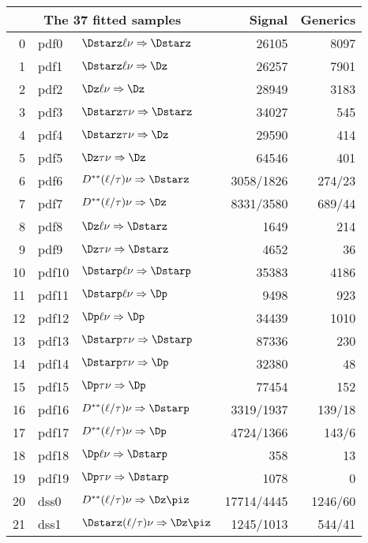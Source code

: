 \documentclass[6pt]{article}
\begin{document}
\begin{tabular}{r l l r r}\\ \hline\hline
\multicolumn{3}{c}{\bf The 37 fitted samples}    &  Signal & Generics  \\ \hline
0 & pdf0   & $\Dstarz\ell\nu\Rightarrow\Dstarz$    &  26105   &  8097  \\
1 & pdf1   & $\Dstarz\ell\nu\Rightarrow\Dz$    &   26257  &  7901  \\
2 & pdf2   & $\Dz\ell\nu\Rightarrow\Dz$    &   28949  &  3183  \\
3 & pdf3   & $\Dstarz\tau\nu\Rightarrow\Dstarz$    &  34027   &  545  \\
4 & pdf4   & $\Dstarz\tau\nu\Rightarrow\Dz$    &   29590  &  414  \\
5 & pdf5   & $\Dz\tau\nu\Rightarrow\Dz$    &  64546   &  401  \\
6 & pdf6   & $D^{**}(\ell/\tau)\nu\Rightarrow\Dstarz$    &  3058/1826  &  274/23  \\
7 & pdf7   & $D^{**}(\ell/\tau)\nu\Rightarrow\Dz$    &  8331/3580   &  689/44  \\
8 & pdf8   & $\Dz\ell\nu\Rightarrow\Dstarz$   &  1649  &  214  \\
9 & pdf9   & $\Dz\tau\nu\Rightarrow\Dstarz$   & 4652   &  36  \\
10 & pdf10 & $\Dstarp\ell\nu\Rightarrow\Dstarp$   &  35383  & 4186   \\
11 & pdf11 & $\Dstarp\ell\nu\Rightarrow\Dp$   &  9498  &  923  \\
12 & pdf12 & $\Dp\ell\nu\Rightarrow\Dp$   &  34439  & 1010   \\
13 & pdf13 & $\Dstarp\tau\nu\Rightarrow\Dstarp$   &  87336  &  230  \\
14 & pdf14 & $\Dstarp\tau\nu\Rightarrow\Dp$   &  32380  & 48   \\
15 & pdf15 & $\Dp\tau\nu\Rightarrow\Dp$   & 77454   &  152  \\
16 & pdf16 & $D^{**}(\ell/\tau)\nu\Rightarrow\Dstarp$   & 3319/1937   & 139/18   \\
17 & pdf17 & $D^{**}(\ell/\tau)\nu\Rightarrow\Dp$   & 4724/1366   & 143/6   \\
18 & pdf18 & $\Dp\ell\nu\Rightarrow\Dstarp$   & 358   &  13  \\
19 & pdf19 & $\Dp\tau\nu\Rightarrow\Dstarp$   &  1078  &  0  \\\hline
20 & dss0  & $D^{**}(\ell/\tau)\nu\Rightarrow\Dz\piz$   &  17714/4445  &  1246/60  \\
21 & dss1  & $\Dstarz(\ell/\tau)\nu\Rightarrow\Dz\piz$   &  1245/1013  &  544/41  \\

\end{tabular}
\end{document}
